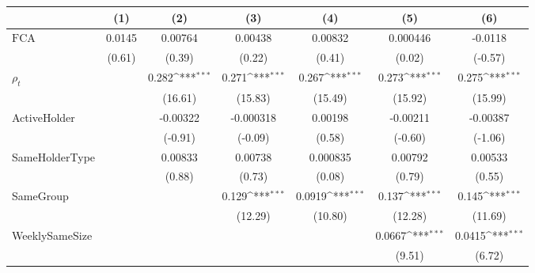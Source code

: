 {
\def\sym#1{\ifmmode^{#1}\else\(^{#1}\)\fi}
\begin{tabular}{l*{6}{c}}
\hline\hline
                    &\multicolumn{1}{c}{(1)}         &\multicolumn{1}{c}{(2)}         &\multicolumn{1}{c}{(3)}         &\multicolumn{1}{c}{(4)}         &\multicolumn{1}{c}{(5)}         &\multicolumn{1}{c}{(6)}         \\
\hline
$ \text{FCA} $      &      0.0145         &     0.00764         &     0.00438         &     0.00832         &    0.000446         &     -0.0118         \\
                    &      (0.61)         &      (0.39)         &      (0.22)         &      (0.41)         &      (0.02)         &     (-0.57)         \\
[1em]
$ \rho_t $         &                     &       0.282\sym{***}&       0.271\sym{***}&       0.267\sym{***}&       0.273\sym{***}&       0.275\sym{***}\\
                    &                     &     (16.61)         &     (15.83)         &     (15.49)         &     (15.92)         &     (15.99)         \\
[1em]
ActiveHolder        &                     &    -0.00322         &   -0.000318         &     0.00198         &    -0.00211         &    -0.00387         \\
                    &                     &     (-0.91)         &     (-0.09)         &      (0.58)         &     (-0.60)         &     (-1.06)         \\
[1em]
SameHolderType      &                     &     0.00833         &     0.00738         &    0.000835         &     0.00792         &     0.00533         \\
                    &                     &      (0.88)         &      (0.73)         &      (0.08)         &      (0.79)         &      (0.55)         \\
[1em]
SameGroup           &                     &                     &       0.129\sym{***}&      0.0919\sym{***}&       0.137\sym{***}&       0.145\sym{***}\\
                    &                     &                     &     (12.29)         &     (10.80)         &     (12.28)         &     (11.69)         \\
[1em]
WeeklySameSize      &                     &                     &                     &                     &      0.0667\sym{***}&      0.0415\sym{***}\\
                    &                     &                     &                     &                     &      (9.51)         &      (6.72)         \\

\end{tabular}}
